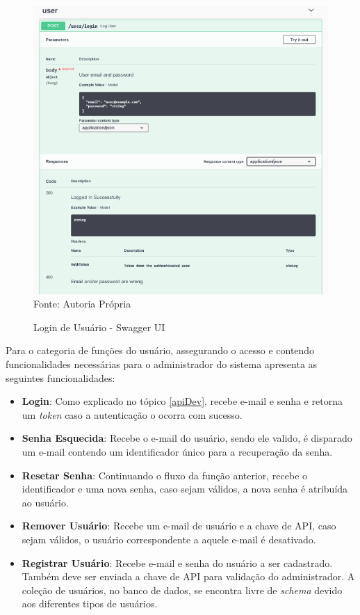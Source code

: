 \begin{figure}[H]
\centering
\captionsetup{justification   = raggedright,
              singlelinecheck = false}
\caption{Login de Usuário - Swagger UI}\label{swaggerLogin}
\includegraphics[width=1\textwidth]{figs/swaggerLogin.png}
\footnotesize Fonte: Autoria Própria
\end{figure}

Para o categoria de funções do usuário, assegurando o acesso e contendo funcionalidades necessárias para o administrador do sistema apresenta as seguintes funcionalidades:

\begin{itemize}
    \item \textbf{Login}: Como explicado no tópico \ref{apiDev}, recebe e-mail e senha e retorna um \textit{token} caso a autenticação o ocorra com sucesso.
    
    \item \textbf{Senha Esquecida}: Recebe o e-mail do usuário, sendo ele valido, é disparado um e-mail contendo um identificador único para a recuperação da senha.
    
    \item \textbf{Resetar Senha}: Continuando o fluxo da função anterior, recebe o identificador e uma nova senha, caso sejam válidos, a nova senha é atribuída ao usuário.
    
    \item \textbf{Remover Usuário}: Recebe um e-mail de usuário e a chave de API, caso sejam válidos, o usuário correspondente a aquele e-mail é desativado.
    
    \item \textbf{Registrar Usuário}: Recebe e-mail e senha do usuário a ser cadastrado. Também deve ser enviada a chave de API para validação do administrador. A coleção de usuários, no banco de dados, se encontra livre de \textit{schema} devido aos diferentes tipos de usuários. 
\end{itemize}

